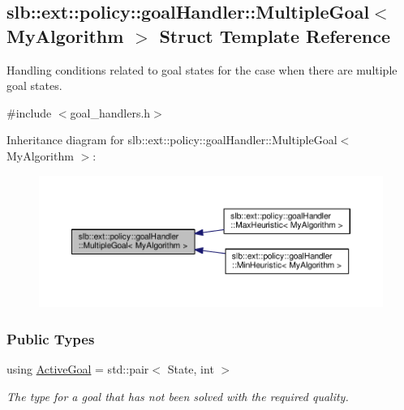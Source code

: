 \hypertarget{structslb_1_1ext_1_1policy_1_1goalHandler_1_1MultipleGoal}{}\subsection{slb\+:\+:ext\+:\+:policy\+:\+:goal\+Handler\+:\+:Multiple\+Goal$<$ My\+Algorithm $>$ Struct Template Reference}
\label{structslb_1_1ext_1_1policy_1_1goalHandler_1_1MultipleGoal}


Handling conditions related to goal states for the case when there are multiple goal states.  




{\ttfamily \#include $<$goal\+\_\+handlers.\+h$>$}



Inheritance diagram for slb\+:\+:ext\+:\+:policy\+:\+:goal\+Handler\+:\+:Multiple\+Goal$<$ My\+Algorithm $>$\+:\nopagebreak
\begin{figure}[H]
\begin{center}
\leavevmode
\includegraphics[width=350pt]{structslb_1_1ext_1_1policy_1_1goalHandler_1_1MultipleGoal__inherit__graph}
\end{center}
\end{figure}
\subsubsection*{Public Types}
\begin{DoxyCompactItemize}
\item 
using \hyperlink{structslb_1_1ext_1_1policy_1_1goalHandler_1_1MultipleGoal_ab5c8ba5693e69007544a7e9e4a48f7fa}{Active\+Goal} = std\+::pair$<$ State, int $>$\hypertarget{structslb_1_1ext_1_1policy_1_1goalHandler_1_1MultipleGoal_ab5c8ba5693e69007544a7e9e4a48f7fa}{}\label{structslb_1_1ext_1_1policy_1_1goalHandler_1_1MultipleGoal_ab5c8ba5693e69007544a7e9e4a48f7fa}

\begin{DoxyCompactList}\small\item\em The type for a goal that has not been solved with the required quality. \end{DoxyCompactList}\end{DoxyCompactItemize}
